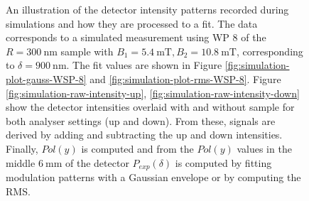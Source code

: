 \begin{figure}[htbp]
	\caption{An illustration of the detector intensity patterns recorded during simulations and how they are processed to a fit. The data corresponds to a simulated measurement using WP 8 of the $R = \SI{300}{\nano\meter}$ sample with $B_1 = \SI{5.4}{\milli\tesla}, B_2 = \SI{10.8}{\milli\tesla}$, corresponding to $\delta = \SI{900}{\nano\meter}$. The fit values are shown in Figure \ref{fig:simulation-plot-gauss-WSP-8} and \ref{fig:simulation-plot-rms-WSP-8}. Figure \ref{fig:simulation-raw-intensity-up}, \ref{fig:simulation-raw-intensity-down} show the detector intensities overlaid with and without sample for both analyser settings (up and down). From these, signals are derived by adding and subtracting the up and down intensities. Finally, $Pol(y)$ is computed and from the $Pol(y)$ values in the middle $\SI{6}{\milli\meter}$ of the detector $P_{exp}(\delta)$ is computed by fitting modulation patterns with a Gaussian envelope or by computing the RMS.}
	\label{fig:simulation-raw-intensity}
\end{figure}

